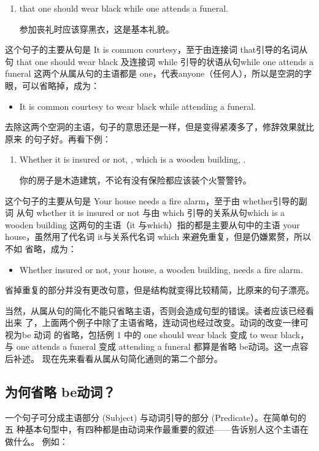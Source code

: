 \begin{enumerate}
\item {}   that one should wear
  black while one attends a funeral.

  参加丧礼时应该穿黑衣，这是基本礼貌。
\end{enumerate}
这个句子的主要从句是 It is common courtesy，至于由连接词 that引导的名词从
句 that one should wear black 及连接词 while 引导的状语从句while one attends
a funeral 这两个从属从句的主语都是 one，代表anyone（任何人），所以是空洞的字
眼，可以省略掉，成为：
\begin{itemize}
\item It is common courtesy to wear black while attending a funeral.
\end{itemize}
去除这两个空洞的主语，句子的意思还是一样，但是变得紧凑多了，修辞效果就比原来
的句子好。再看下例：
\begin{enumerate}[resume]
\item Whether it is insured or not, , which is a wooden
  building,  .

  你的房子是木造建筑，不论有没有保险都应该装个火警警钤。
\end{enumerate}
这个句子的主要从句是 Your house needs a fire alarm，至于由 whether引导的副词
从句 whether it is insured or not 与由 which 引导的关系从句which is a
wooden building 这两句的主语（it 与which）指的都是主要从句中的主语 your
house，虽然用了代名词 it与关系代名词 which 来避免重复，但是仍嫌累赘，所以不如
省略，成为：
\begin{itemize}
\item Whether insured or not, your house, a wooden building, needs a fire
  alarm.
\end{itemize}
省掉重复的部分并没有更改句意，但是结构就变得比较精简，比原来的句子漂亮。

当然，从属从句的简化不能只省略主语，否则会造成句型的错误。读者应该已经看出来
了，上面两个例子中除了主语省略，连动词也经过改变。动词的改变一律可视为be 动词
的省略，包括例 1 中的 one should wear black 变成 to wear black，与 one
attends a funeral 变成 attending a funeral 都算是省略 be动词。这一点容后补述。
现在先来看看从属从句简化通则的第二个部分。

\subsection{为何省略 be动词？}

一个句子可分成主语部分 (Subject) 与动词引导的部分 (Predicate）。在简单句的五
种基本句型中，有四种都是由动词来作最重要的叙述——告诉别人这个主语在做什么。
例如：

